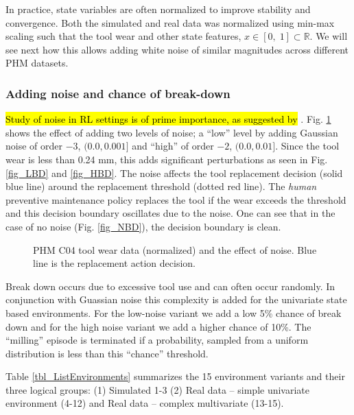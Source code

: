 \documentclass[referee, sn-mathphys-num]{sn-jnl}
\newcommand{\hlc}[2][cyan!17]{{\colorlet{foo}{#1}\sethlcolor{foo}\hl{#2}}}
\begin{document}
	
	In practice, state variables are often normalized to improve stability and convergence. Both the simulated and real data was normalized using min-max scaling such that the tool wear and other state features, $x \in [0,\;1] \subset \mathbb{R} $. We will see next how this allows adding white noise of similar magnitudes across different PHM datasets.
	
	\subsubsection*{Adding noise and chance of break-down}
	\hlc{Study of noise in RL settings is of prime importance, as suggested by} \cite{Eimer2023AutoRL}. Fig. \ref{fig_noise} shows the effect of adding two levels of noise; a ``low'' level by adding Gaussian noise of order $-3$, $(0.0, 0.001]$ and ``high'' of order $-2$, $(0.0, 0.01]$. Since the tool wear is less than 0.24 mm, this adds significant perturbations as seen in Fig. \ref{fig_LBD} and \ref{fig_HBD}. The noise affects the tool replacement decision (solid blue line) around the replacement threshold (dotted red line). The \textit{human} preventive maintenance policy replaces the tool if the wear exceeds the threshold and this decision boundary oscillates due to the noise. One can see that in the case of no noise (Fig. \ref{fig_NBD}), the decision boundary is clean.
	
	\begin{figure}
		\centering	
		\caption{PHM C04 tool wear data (normalized) and the effect of noise. Blue line is the replacement action decision.}
		\label{fig_noise}
	\end{figure}
	
	Break down occurs due to excessive tool use and can often occur randomly. In conjunction with Guassian noise this complexity is added for the univariate state based environments. For the low-noise variant we add a low 5\% chance of break down and for the high noise variant we add a higher chance of 10\%. The ``milling'' episode is terminated if a probability, sampled from a uniform distribution is less than this ``chance'' threshold.
	
	Table \ref{tbl_ListEnvironments} summarizes the 15 environment variants and their three logical groups: (1) Simulated 1-3 (2) Real data -- simple univariate environment (4-12) and Real data -- complex multivariate (13-15).
	
\end{document}
